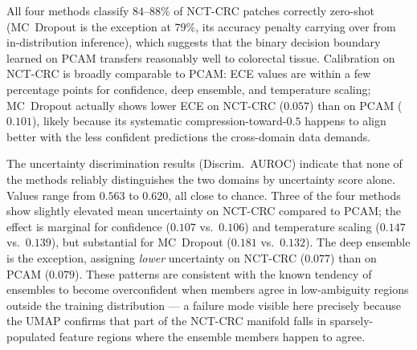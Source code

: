 \begin{table}[H]
    \centering
    \caption{Cross-domain transfer results. Accuracy is evaluated on the binary tumor/normal decision boundary of the PCAM-trained model applied to NCT-CRC. ECE measures calibration on each domain separately. Uncertainty is $1 - \mathrm{MSP}$; the discrimination AUROC uses uncertainty to separate the two domains, treating PCAM as negative and NCT-CRC as positive --- values near $0.5$ indicate the domains are indistinguishable by uncertainty alone.}
    \label{tab:cross_domain}
\end{table}

All four methods classify $84$--$88\%$ of NCT-CRC patches correctly zero-shot (MC~Dropout is the exception at $79\%$, its accuracy penalty carrying over from in-distribution inference), which suggests that the binary decision boundary learned on PCAM transfers reasonably well to colorectal tissue. Calibration on NCT-CRC is broadly comparable to PCAM: ECE values are within a few percentage points for confidence, deep ensemble, and temperature scaling; MC~Dropout actually shows lower ECE on NCT-CRC ($0.057$) than on PCAM ($0.101$), likely because its systematic compression-toward-$0.5$ happens to align better with the less confident predictions the cross-domain data demands.

The uncertainty discrimination results (Discrim.\ AUROC) indicate that none of the methods reliably distinguishes the two domains by uncertainty score alone. Values range from $0.563$ to $0.620$, all close to chance. Three of the four methods show slightly elevated mean uncertainty on NCT-CRC compared to PCAM; the effect is marginal for confidence ($0.107$ vs.\ $0.106$) and temperature scaling ($0.147$ vs.\ $0.139$), but substantial for MC~Dropout ($0.181$ vs.\ $0.132$). The deep ensemble is the exception, assigning \emph{lower} uncertainty on NCT-CRC ($0.077$) than on PCAM ($0.079$). These patterns are consistent with the known tendency of ensembles to become overconfident when members agree in low-ambiguity regions outside the training distribution \cite{linmans2022ood} --- a failure mode visible here precisely because the UMAP confirms that part of the NCT-CRC manifold falls in sparsely-populated feature regions where the ensemble members happen to agree.

